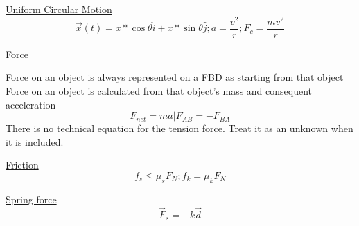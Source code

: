 \documentclass[8pt]{minimal}
\begin{document}
\underline{Uniform Circular Motion}
\begin{equation*}
    \vec{x}(t)=x*\cos\theta \hat{i} + x*\sin\theta \hat{j}  ;a=\frac{v^2}{r} ; F_c=\frac{mv^2}{r}
\end{equation*}

\underline{Force}

Force on an object is always represented on a FBD as starting from that object\\
Force on an object is calculated from that object's mass and consequent acceleration
\begin{equation*}
    F_{net}=ma      |      F_{AB}=-F_{BA}
\end{equation*}
There is no technical equation for the tension force. Treat it as an unknown when it is included.

\underline{Friction}
\begin{equation*}
    f_s \le \mu_s F_N ; f_k = \mu_k F_N
\end{equation*}

\underline{Spring force}
\begin{equation*}
    \vec{F}_s = -k\vec{d}
\end{equation*}
\end{document}

